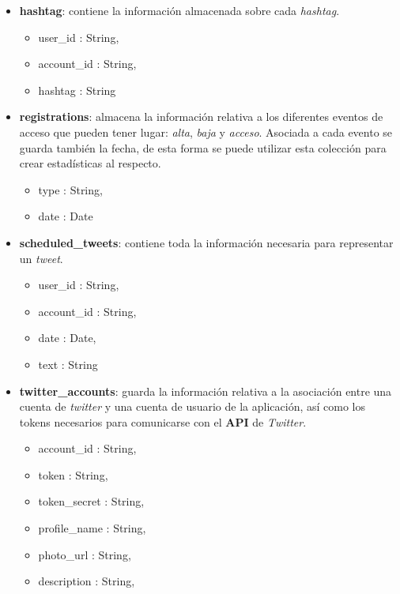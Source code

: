 \documentclass[a4paper]{article}
\begin{document}
	\begin{itemize}
	\item \textbf{hashtag}: contiene la información almacenada sobre cada \textit{hashtag}.
		
		\begin{itemize}
		\item user\_id : String,
		\item account\_id : String,
		\item hashtag : String
		\end{itemize}
		
	\item \textbf{registrations}: almacena la información relativa a los diferentes eventos de acceso que pueden tener lugar: \textit{alta}, \textit{baja} y \textit{acceso}. Asociada a cada evento se guarda también la fecha, de esta forma se puede utilizar esta colección para crear estadísticas al respecto.
		
		\begin{itemize}
		\item type : String,
		\item date : Date
		\end{itemize}
	\newpage
	\item \textbf{scheduled\_tweets}: contiene toda la información necesaria para representar un \textit{tweet}.
	
		\begin{itemize}
		\item user\_id : String,
		\item account\_id : String,
		\item date : Date,
		\item text : String
		\end{itemize}
	
	\item \textbf{twitter\_accounts}: guarda la información relativa a la asociación entre una cuenta de \textit{twitter} y una cuenta de usuario de la aplicación, así como los tokens necesarios para comunicarse con el \textbf{API} de \textit{Twitter}.
	
		\begin{itemize}
		\item account\_id : String,
		\item token : String,
		\item token\_secret : String,
		\item profile\_name : String,
		\item photo\_url : String,
		\item description : String,
		\end{itemize}
	

\end{itemize}
\end{document}
